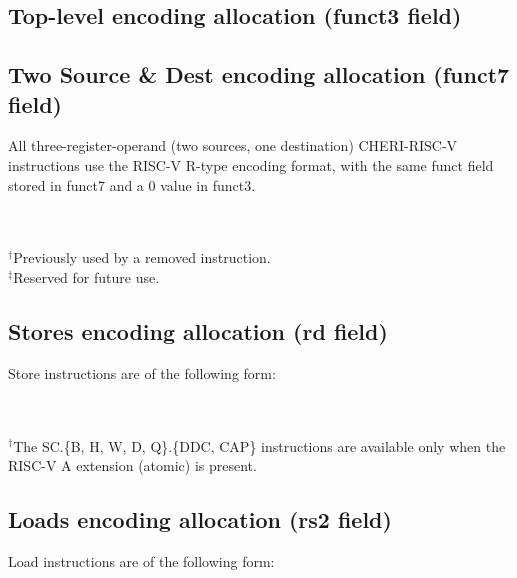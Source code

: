{	\subsection*{Top-level encoding allocation (funct3 field)}
	{\rvcherienctablefontsize
	\rvcherienctabletop
	}

	\subsection*{Two Source \& Dest encoding allocation (funct7 field)}
	All three-register-operand (two sources, one destination) CHERI-RISC-V instructions use the RISC-V R-type encoding format, with the same funct field stored in funct7 and a 0 value in funct3.

	\vspace{1em}


	\vspace{1em}

	{\rvcherienctablefontsize
	\def\rvcheriremovedfootnotemark{$^\dagger$}
	\def\rvcherireservedfootnotemark{$^\ddagger$}
	\rvcherienctablesrcsrcdest\\\\
	\footnotesize
	$^\dagger$Previously used by a removed instruction.\\
	$^\ddagger$Reserved for future use.
	}

	\subsection*{Stores encoding allocation  (rd field)}
	Store instructions are of the following form:
	\vspace{1em}

	\rvcheriheader

	\vspace{1em}

	{\rvcherienctablefontsize
	\def\rvcheriatomicfootnotemark{$^\dagger$}
	\rvcherienctableexpstore\\\\
	\footnotesize
	$^\dagger$The SC.\{B, H, W, D, Q\}.\{DDC, CAP\} instructions are available only when the RISC-V A extension (atomic) is present.
	}

	\vspace{1em}

	\subsection*{Loads encoding allocation  (rs2 field)}
	Load instructions are of the following form:
	\vspace{1em}

}
